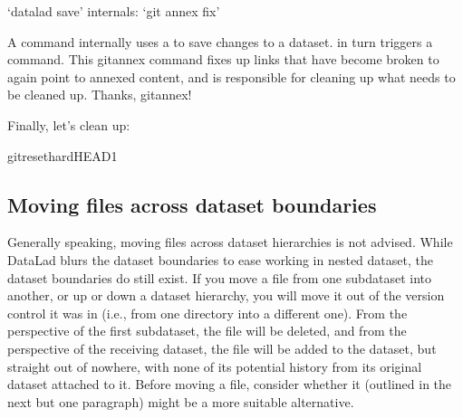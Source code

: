 \ignorespaces \begin{gitusernote}[label={gun-annex-fix}, before title={\thetcbcounter\ }, float, floatplacement=tp, check odd page=true]{‘datalad save’ internals: ‘git annex fix’}
\label{\detokenize{basics/101-136-filesystem:gun-annex-fix}}

\sphinxAtStartPar
A  command internally uses a  to save changes to a dataset.
 in turn triggers a 
command. This git\sphinxhyphen{}annex command fixes up links that have become broken
to again point to annexed content, and is responsible for cleaning up
what needs to be cleaned up. Thanks, git\sphinxhyphen{}annex!


\end{gitusernote}

\sphinxAtStartPar
Finally, let’s clean up:

\begin{sphinxVerbatim}[commandchars=\\\{\}]
gitreset\PYGZhy{}\PYGZhy{}hardHEAD\PYGZti{}1
\end{sphinxVerbatim}

\ignorespaces 

\subsection{Moving files across dataset boundaries}
\label{\detokenize{basics/101-136-filesystem:moving-files-across-dataset-boundaries}}\label{\detokenize{basics/101-136-filesystem:index-6}}
\sphinxAtStartPar
Generally speaking, moving files across dataset hierarchies is not advised.
While DataLad blurs the dataset boundaries to ease working in nested dataset,
the dataset boundaries do still exist. If you move a file from one subdataset
into another, or up or down a dataset hierarchy, you will move it out of the
version control it was in (i.e., from one  directory into a different
one). From the perspective of the first subdataset, the file will be deleted,
and from the perspective of the receiving dataset, the file will be added to
the dataset, but straight out of nowhere, with none of its potential history
from its original dataset attached to it. Before moving a file, consider whether
 it (outlined in the next but one paragraph) might be a more suitable
alternative.

